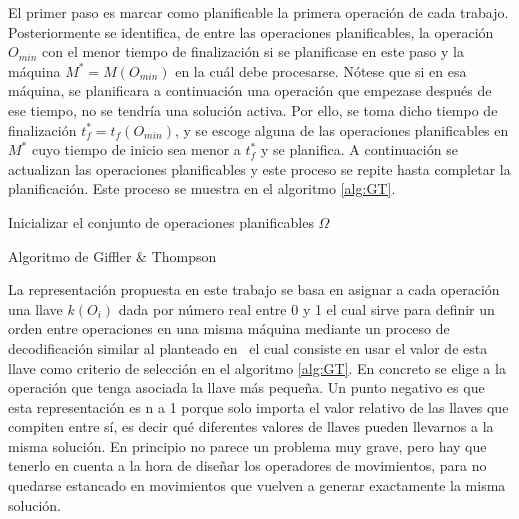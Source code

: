 El primer paso es marcar como planificable la primera operación de cada trabajo. 
%
Posteriormente se identifica, de entre las operaciones planificables, la operación $O_{min}$ con el menor tiempo de finalización si se planificase en 
este paso y la máquina $M^*=M(O_{min})$ en la cuál debe procesarse. 
%
Nótese que si en esa máquina, se planificara a continuación una operación que empezase después de ese tiempo, no se tendría una solución activa.
%
Por ello, se toma dicho tiempo de finalización $t^*_f = t_f(O_{min})$, y se escoge alguna de las operaciones planificables en $M^*$ cuyo tiempo de inicio sea menor
a $t^*_f$ y se planifica.
%
A continuación se actualizan las operaciones planificables y este proceso se repite hasta completar la planificación. 
%
Este proceso se muestra en el algoritmo \ref{alg:GT}.

\begin{algorithm}[h]
 Inicializar el conjunto de operaciones planificables $\Omega$\;
    \caption{Algoritmo de Giffler \& Thompson}
    \label{alg:GT}
\end{algorithm}

La representación propuesta en este trabajo se basa en asignar a cada operación una llave $k(O_i)$ dada por número real entre 0 y 1 el cual sirve para definir un orden entre 
operaciones en una misma máquina mediante un proceso de decodificación similar al planteado en~\cite{bean1994genetic,norman1996random,Ponsich2013} el cual consiste en usar el valor de esta llave como criterio de selección en el algoritmo \ref{alg:GT}.
%
En concreto se elige a la operación que tenga asociada la llave más pequeña.
%
Un punto negativo es que esta representación es n a 1 porque solo importa el valor relativo de las llaves que compiten entre sí, es decir qué diferentes 
valores de llaves pueden llevarnos a la misma solución. 
%
En principio no parece un problema muy grave, pero hay que tenerlo en cuenta a la hora de diseñar los operadores de movimientos, para no quedarse
estancado en movimientos que vuelven a generar exactamente la misma solución.

